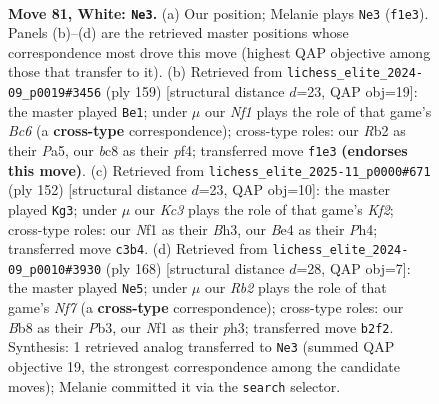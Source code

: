 \documentclass[11pt]{article}
\begin{document}
\clearpage

\begin{figure}[p]\centering
\begin{subfigure}{0.46\textwidth}\centering
\resizebox{\linewidth}{!}{%
\newchessgame
\chessboard[
  setfen={1Bb5/5k2/8/1P6/P3B3/2K4p/1R6/5Nr1 w - - 1 81},
  showmover=false,
  pgfstyle=straightmove, color=movearrow, markmove={f1-e3}
]}
\caption{}
\end{subfigure}\hfill
\begin{subfigure}{0.46\textwidth}\centering
\resizebox{\linewidth}{!}{%
\newchessgame
\chessboard[
  setfen={5k2/8/8/p4K2/P4P1p/2b3r1/2R5/5B2 b - - 5 80},
  showmover=false,
  pgfstyle=straightmove, color=movearrow, markmove={c3-e1}
]}
\caption{}
\end{subfigure}
\\[4pt]
\begin{subfigure}{0.46\textwidth}\centering
\resizebox{\linewidth}{!}{%
\newchessgame
\chessboard[
  setfen={8/8/1Pb5/R7/3k3P/P4p1B/5K2/7r w - - 5 77},
  showmover=false,
  pgfstyle=straightmove, color=movearrow, markmove={f2-g3}
]}
\caption{}
\end{subfigure}\hfill
\begin{subfigure}{0.46\textwidth}\centering
\resizebox{\linewidth}{!}{%
\newchessgame
\chessboard[
  setfen={8/P4N2/4nB2/3b3k/8/KP4Rp/7P/8 w - - 15 85},
  showmover=false,
  pgfstyle=straightmove, color=movearrow, markmove={f7-e5}
]}
\caption{}
\end{subfigure}
\caption{\textbf{Move 81, White: \texttt{Ne3}.} (a) Our position; Melanie plays \texttt{Ne3} (\texttt{f1e3}). Panels (b)--(d) are the retrieved master positions whose correspondence most drove this move (highest QAP objective among those that transfer to it). (b) Retrieved from \texttt{lichess\_elite\_2024-09\_p0019\#3456} (ply 159) [structural distance $d$=23, QAP obj=19]: the master played \texttt{Be1}; under $\mu$ our \emph{Nf1} plays the role of that game's \emph{Bc6} (a \textbf{cross-type} correspondence); cross-type roles: our \emph{R}b2 as their \emph{P}a5, our \emph{b}c8 as their \emph{p}f4; transferred move \texttt{f1e3} \textbf{(endorses this move)}. (c) Retrieved from \texttt{lichess\_elite\_2025-11\_p0000\#671} (ply 152) [structural distance $d$=23, QAP obj=10]: the master played \texttt{Kg3}; under $\mu$ our \emph{Kc3} plays the role of that game's \emph{Kf2}; cross-type roles: our \emph{N}f1 as their \emph{B}h3, our \emph{B}e4 as their \emph{P}h4; transferred move \texttt{c3b4}. (d) Retrieved from \texttt{lichess\_elite\_2024-09\_p0010\#3930} (ply 168) [structural distance $d$=28, QAP obj=7]: the master played \texttt{Ne5}; under $\mu$ our \emph{Rb2} plays the role of that game's \emph{Nf7} (a \textbf{cross-type} correspondence); cross-type roles: our \emph{B}b8 as their \emph{P}b3, our \emph{N}f1 as their \emph{p}h3; transferred move \texttt{b2f2}. Synthesis: 1 retrieved analog transferred to \texttt{Ne3} (summed QAP objective 19, the strongest correspondence among the candidate moves); Melanie committed it via the \texttt{search} selector.}
\label{fig:thought-m160}
\end{figure}
\end{document}
